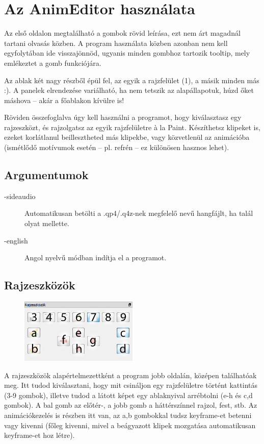 \documentclass[a4paper,12pt,release]{article}
\begin{document}
\section{Az AnimEditor használata}
Az első oldalon megtalálható a gombok rövid leírása, ezt nem árt magadnál tartani olvasás közben. A program használata közben azonban nem kell egyfolytában ide visszajönnöd, ugyanis minden gombhoz tartozik tooltip, mely emlékeztet a gomb funkciójára.

Az ablak két nagy részből épül fel, az egyik a rajzfelület (1), a másik minden más :). A panelek elrendezése variálható, ha nem tetszik az alapállapotuk, húzd őket máshova -- akár a főablakon kívülre is!

Röviden összefoglalva úgy kell használni a programot, hogy kiválasztasz egy rajzeszközt, és rajzolgatsz az egyik rajzfelületre \`a la Paint. Készíthetsz klipeket is, ezeket korlátlanul beillesztheted más klipekbe, vagy közvetlenül az animációba (ismétlődő motívumok esetén -- pl. refrén -- ez különösen hasznos lehet).

\subsection{Argumentumok}
\begin{description}
\item[-sideaudio] Automatikusan betölti a .qp4/.q4z-nek megfelelő nevű hangfájlt, ha talál olyat mellette.
\item[-english] Angol nyelvű módban indítja el a programot.
\end{description}

\subsection{Rajzeszközök}
\begin{figure}
	\vspace{-27pt}
	\begin{center}
		\includegraphics[width=0.5\textwidth]{pics/tools.png}
	\end{center}
	\vspace{-20pt}
\end{figure}
A rajzeszközök alapértelmezettként a program jobb oldalán, középen találhatóak meg. Itt tudod kiválasztani, hogy mit csináljon egy rajzfelületre történt kattintás (3-9 gombok), illetve tudod a látott képet egy ablaknyival arrébtolni (e-h és c,d gombok). A bal gomb az előtér-, a jobb gomb a háttérszínnel rajzol, fest, stb. Az animációkezelés is részben itt van, az a,b gombokkal tudsz keyframe-et betenni vagy kivenni (főleg kivenni, mivel a beágyazott klipek mozgatása automatikusan keyframe-et hoz létre).
\end{document}
